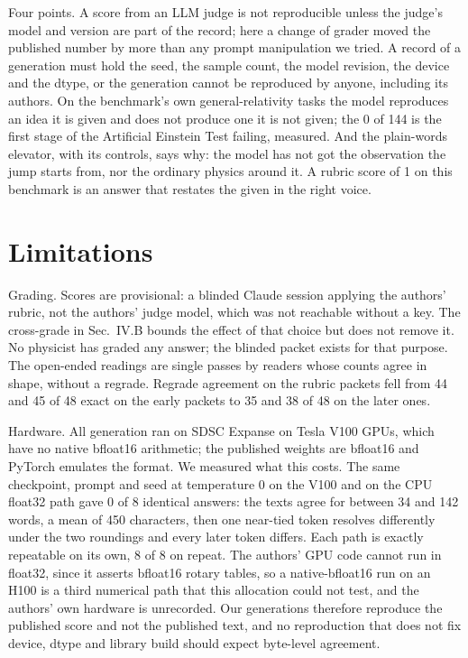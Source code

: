 \documentclass[reprint,prx,amsmath,amssymb,aps,superscriptaddress]{revtex4-2}
\begin{document}
Four points. A score from an LLM judge is not reproducible unless the judge's model and version are part of the record; here a change of grader moved the published number by more than any prompt manipulation we tried. A record of a generation must hold the seed, the sample count, the model revision, the device and the dtype, or the generation cannot be reproduced by anyone, including its authors. On the benchmark's own general-relativity tasks the model reproduces an idea it is given and does not produce one it is not given; the 0 of 144 is the first stage of the Artificial Einstein Test failing, measured. And the plain-words elevator, with its controls, says why: the model has not got the observation the jump starts from, nor the ordinary physics around it. A rubric score of 1 on this benchmark is an answer that restates the given in the right voice.

\section{Limitations}

Grading. Scores are provisional: a blinded Claude session applying the authors' rubric, not the authors' judge model, which was not reachable without a key. The cross-grade in Sec.~IV.B bounds the effect of that choice but does not remove it. No physicist has graded any answer; the blinded packet exists for that purpose. The open-ended readings are single passes by readers whose counts agree in shape, without a regrade. Regrade agreement on the rubric packets fell from 44 and 45 of 48 exact on the early packets to 35 and 38 of 48 on the later ones.

Hardware. All generation ran on SDSC Expanse on Tesla V100 GPUs, which have no native bfloat16 arithmetic; the published weights are bfloat16 and PyTorch emulates the format. We measured what this costs. The same checkpoint, prompt and seed at temperature 0 on the V100 and on the CPU float32 path gave 0 of 8 identical answers: the texts agree for between 34 and 142 words, a mean of 450 characters, then one near-tied token resolves differently under the two roundings and every later token differs. Each path is exactly repeatable on its own, 8 of 8 on repeat. The authors' GPU code cannot run in float32, since it asserts bfloat16 rotary tables, so a native-bfloat16 run on an H100 is a third numerical path that this allocation could not test, and the authors' own hardware is unrecorded. Our generations therefore reproduce the published score and not the published text, and no reproduction that does not fix device, dtype and library build should expect byte-level agreement.
\end{document}
